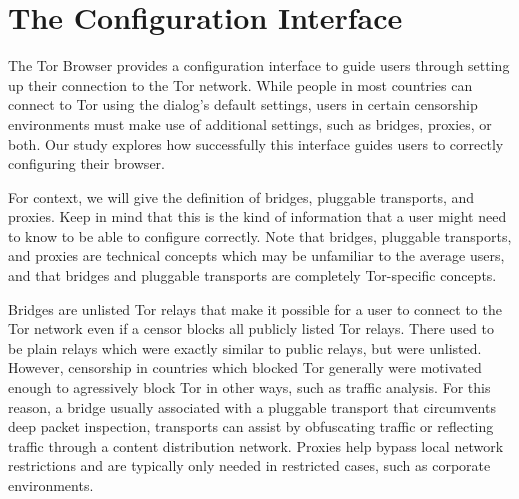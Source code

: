 \documentclass{template}
\begin{document}
\section{The Configuration Interface}

The Tor Browser provides a configuration interface to guide users through setting up 
their connection to the
Tor network. While people in most countries can connect to Tor using the
dialog's default settings, users in certain censorship environments must
make use of additional settings, such as bridges, proxies, or both. 
Our study explores how successfully this interface guides users to
correctly configuring their browser.

For context, we will give the definition of bridges, pluggable transports, and proxies. 
Keep in mind that this is the kind of information that a user might need to know to be able
to configure correctly. Note that bridges, pluggable transports, and proxies are technical 
concepts which may be unfamiliar to the average users, and that bridges and pluggable 
transports are completely Tor-specific concepts. 

Bridges are unlisted Tor relays that make it possible for a user to connect
to the Tor network even if a censor blocks all publicly listed Tor relays. There used 
to be plain relays which were exactly similar to public relays, but were unlisted. However, 
censorship in countries which blocked Tor generally were motivated enough to agressively
block Tor in other ways, such as traffic analysis. For this reason, a bridge usually associated 
with a pluggable transport that circumvents deep packet inspection, transports can 
assist by obfuscating traffic or reflecting traffic through a content distribution network. 
Proxies help bypass local network restrictions and are typically only
needed in restricted cases, such as corporate environments.\\

\end{document}
